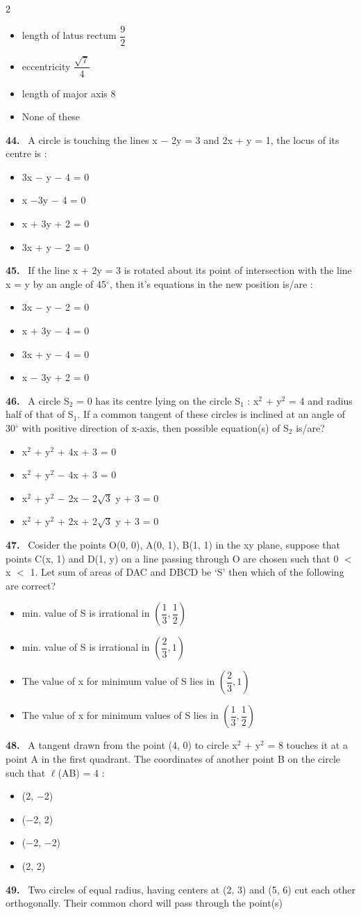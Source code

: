 \documentclass[10pt]{extarticle}
\newcommand{\qn}[1]{\par\smallskip\noindent\textbf{#1.}~}
\newenvironment{qoptions}{\begin{itemize}[leftmargin=1.8em,itemsep=1pt,topsep=2pt,label={}]}{\end{itemize}}
\newcommand{\opt}[2]{\item[(#1)] #2}
\begin{document}
\begin{multicols}{2}
\begin{qoptions}
\opt{A}{length of latus rectum $\dfrac92$}
\opt{B}{eccentricity $\dfrac{\sqrt7}4$}
\opt{C}{length of major axis 8}
\opt{D}{None of these}
\end{qoptions}
\qn{44} A circle is touching the lines x $-$ 2y = 3 and 2x + y = 1, the locus of its centre is :
\begin{qoptions}
\opt{A}{3x $-$ y $-$ 4 = 0}
\opt{B}{x $-$3y $-$ 4 = 0}
\opt{C}{x + 3y + 2 = 0}
\opt{D}{3x + y $-$ 2 = 0}
\end{qoptions}
\qn{45} If the line x + 2y = 3 is rotated about its point of intersection with the line x = y by an angle of 45$^\circ$, then it's equations in the new position is/are :
\begin{qoptions}
\opt{A}{3x $-$ y $-$ 2 = 0}
\opt{B}{x + 3y $-$ 4 = 0}
\opt{C}{3x + y $-$ 4 = 0}
\opt{D}{x $-$ 3y + 2 = 0}
\end{qoptions}
\qn{46} A circle S$_2$ = 0 has its centre lying on the circle S$_1$ : x$^2$ + y$^2$ = 4 and radius half of that of S$_1$. If a common tangent of these circles is inclined at an angle of 30$^\circ$ with positive direction of x-axis, then possible equation(s) of S$_2$ is/are?
\begin{qoptions}
\opt{A}{x$^2$ + y$^2$ + 4x + 3 = 0}
\opt{B}{x$^2$ + y$^2$ $-$ 4x + 3 = 0}
\opt{C}{x$^2$ + y$^2$ $-$ 2x $-$ 2$\sqrt3$ y + 3 = 0}
\opt{D}{x$^2$ + y$^2$ + 2x + 2$\sqrt3$ y + 3 = 0}
\end{qoptions}
\qn{47} Cosider the points O(0, 0), A(0, 1), B(1, 1) in the xy plane, suppose that points C(x, 1) and D(1, y) on a line passing through O are chosen such that 0 $<$ x $<$ 1. Let sum of areas of DAC and DBCD be `S' then which of the following are correct?
\begin{qoptions}
\opt{A}{min. value of S is irrational in $\left(\dfrac13,\dfrac12\right)$}
\opt{B}{min. value of S is irrational in $\left(\dfrac23,1\right)$}
\opt{C}{The value of x for minimum value of S lies in $\left(\dfrac23,1\right)$}
\opt{D}{The value of x for minimum values of S lies in $\left(\dfrac13,\dfrac12\right)$}
\end{qoptions}
\qn{48} A tangent drawn from the point (4, 0) to circle x$^2$ + y$^2$ = 8 touches it at a point A in the first quadrant. The coordinates of another point B on the circle such that $\ell$(AB) = 4 :
\begin{qoptions}
\opt{A}{(2, $-$2)}
\opt{B}{($-$2, 2)}
\opt{C}{($-$2, $-$2)}
\opt{D}{(2, 2)}
\end{qoptions}
\qn{49} Two circles of equal radius, having centers at (2, 3) and (5, 6) cut each other orthogonally. Their common chord will pass through the point(s)

\end{multicols}
\end{document}
